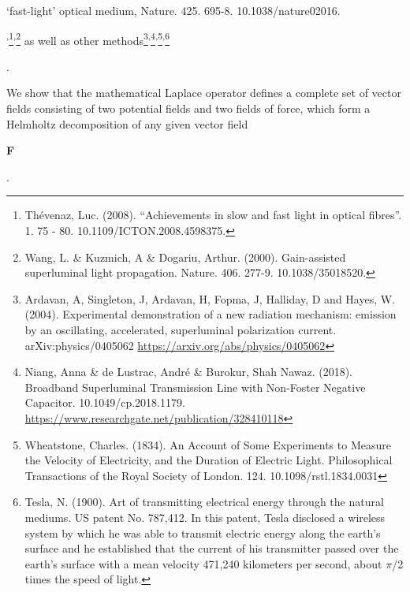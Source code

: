 \documentclass[a4paper]{article}
\newcommand\textstyleNone[1]{#1}
\begin{document}
{{{`fast-light' optical medium, Nature. 425. 695-8. 10.1038/nature02016. }\par
}\textstyleNone{{\textsuperscript{,}}}\footnote{\textstyleNone{
Th\'evenaz, Luc. (2008). ``Achievements in slow and fast light in optical
fibres''. 1. 75 - 80. 10.1109/ICTON.2008.4598375. }\par
}\textstyleNone{{\textsuperscript{,}}}\footnote{\textstyleNone{
Wang, L. \& Kuzmich, A \& Dogariu, Arthur. (2000). Gain-assisted superluminal
light propagation. Nature. 406. 277-9. 10.1038/35018520. }\par
}{ as well as other
methods}\footnote{ Ardavan, A, Singleton, J, Ardavan, H,  Fopma, J, Halliday, D
and Hayes, W. (2004). Experimental demonstration of a new radiation mechanism:
emission by an oscillating, accelerated, superluminal polarization current.
arXiv:physics/0405062 \url{https://arxiv.org/abs/physics/0405062} \par
}\textstyleNone{{\textsuperscript{,}}}\footnote{
Niang, Anna \& de Lustrac, Andr\'e \& Burokur, Shah Nawaz. (2018). Broadband
Superluminal Transmission Line with Non-Foster Negative Capacitor.
10.1049/cp.2018.1179. \url{https://www.researchgate.net/publication/328410118}
\par
}\textstyleNone{{\textsuperscript{,}}}\footnote{\textstyleNone{
Wheatstone, Charles. (1834). An Account of Some Experiments to Measure the
Velocity of Electricity, and the Duration of Electric Light.  Philosophical
Transactions of the Royal Society of London. 124.  10.1098/rstl.1834.0031 }\par
}{\textsuperscript{,}}\footnote{\textstyleNone{
Tesla, N. (1900). Art of transmitting electrical energy through the natural
mediums. US patent No. 787,412. In this patent, Tesla disclosed a wireless
system by which he was able to transmit electric energy along the earth's
surface and he established that the current of his transmitter passed over the
earth's surface with a mean velocity 471,240 kilometers per second, about $\pi
$/2 times the speed of light.}\par
}{.  

We show that the mathematical Laplace operator defines a complete set of vector
fields consisting of two potential fields and two fields of force, which form a
Helmholtz decomposition of any given vector field }\textbf{{F}}{.

}}
\end{document}
